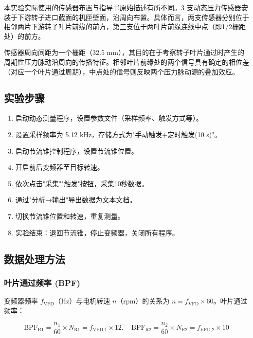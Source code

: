 本实验实际使用的传感器布置与指导书原始描述有所不同。3 支动态压力传感器安装于下游转子进口截面的机匣壁面，沿周向布置。具体而言，两支传感器分别位于相邻两片下游转子叶片前缘的前方，第三支位于两叶片前缘连线中点（即1/2栅距处）的前方。

传感器周向间距为一个栅距（32.5 mm），其目的在于考察转子叶片通过时产生的周期性压力脉动沿周向的传播特征。相邻叶片前缘处的两个信号具有确定的相位差（对应一个叶片通过周期），中点处的信号则反映两个压力脉动源的叠加效应。

\subsection{实验步骤}

\begin{enumerate}
    \item 启动动态测量程序，设置参数文件（采样频率、触发方式等）。
    \item 设置采样频率为 5.12 kHz，存储方式为"手动触发+定时触发(10 s)"。
    \item 启动节流锥控制程序，设置节流锥位置。
    \item 开启前后变频器至目标转速。
    \item 依次点击"采集""触发"按钮，采集10秒数据。
    \item 通过"分析→输出"导出数据为文本文档。
    \item 切换节流锥位置和转速，重复测量。
    \item 实验结束：退回节流锥，停止变频器，关闭所有程序。
\end{enumerate}

\subsection{数据处理方法}

\subsubsection{叶片通过频率 (BPF)}

变频器频率 $f_{\text{VFD}}$（Hz）与电机转速 $n$（rpm）的关系为 $n = f_{\text{VFD}} \times 60$。叶片通过频率：

\begin{equation}
    \text{BPF}_{\text{R1}} = \frac{n_1}{60} \times N_{\text{R1}} = f_{\text{VFD,1}} \times 12, \quad
    \text{BPF}_{\text{R2}} = \frac{n_2}{60} \times N_{\text{R2}} = f_{\text{VFD,2}} \times 10
\end{equation}


